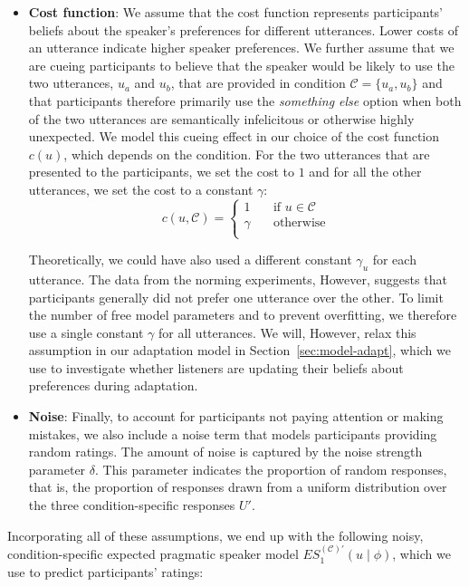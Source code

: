 \documentclass[lucida,biblatex]{sp} %
\newcommand{\sectionref}[1]{Section~\ref{#1}}
\begin{document}
\begin{itemize}
\item \textbf{Cost function}: We assume that the cost function represents participants' beliefs about the speaker's 
preferences for different utterances. Lower costs of an utterance indicate higher speaker preferences. We further 
assume that we are cueing participants to believe that the speaker would be likely to use the two utterances, $u_a$ 
and $u_b$, that are provided in condition $\mathscr{C}=\{u_a, u_b\}$ and that participants therefore primarily use the 
\textit{something else} option when both of the two utterances are semantically infelicitous or otherwise highly unexpected. 
We model this cueing effect in our choice of the cost function $c(u)$, which depends on the condition. For the two utterances 
that are presented to the participants, we set the cost to $1$ and for all the other utterances, we set the cost to a constant $\gamma$:
$$
c(u, \mathscr{C}) = 
     \begin{cases}
       1 &\quad\text{if } u  \in \mathscr{C}\\
       \gamma &\quad\text{otherwise} \\
     \end{cases}
$$

Theoretically, we could have also used a different constant $\gamma_u$ for each utterance. The data from
the norming experiments, However, suggests that participants generally did not prefer one utterance over 
the other. To limit the number of free model parameters and to prevent overfitting, we therefore use a single
constant $\gamma$ for all utterances. We will, However, relax this assumption in our adaptation model in \sectionref{sec:model-adapt}, which
we use to investigate whether listeners are updating their beliefs about preferences during adaptation.

\item \textbf{Noise}: Finally, to account for participants not paying attention or making mistakes, 
we also include a noise term that models participants providing random ratings.
The amount of noise is captured by the noise strength parameter $\delta$. This parameter
indicates the proportion of random responses, that is, the proportion of responses drawn from a uniform distribution
over the three condition-specific responses $U'$. 

\end{itemize}

\noindent Incorporating all of these assumptions, we end up with the following noisy, condition-specific expected pragmatic speaker 
model $ES_1^{(\mathscr{C})'}(u \mid \phi)$, which we use to predict participants' ratings:
\end{document}

